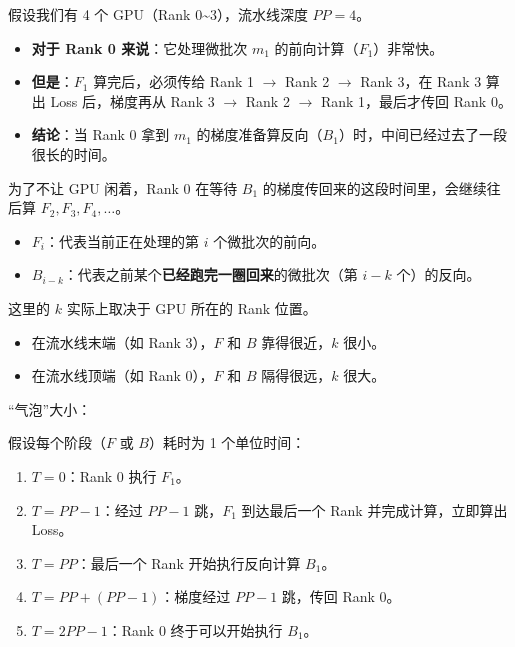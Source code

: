 假设我们有 4 个 GPU（Rank 0\textasciitilde3），流水线深度 \(PP = 4\)。

\begin{itemize}
\tightlist
\item
  \textbf{对于 Rank 0 来说}：它处理微批次 \(m_1\) 的前向计算（\(F_1\)）非常快。
\item
  \textbf{但是}：\(F_1\) 算完后，必须传给 Rank 1 \(\to\) Rank 2 \(\to\) Rank 3，在 Rank 3 算出 Loss 后，梯度再从 Rank 3 \(\to\) Rank 2 \(\to\) Rank 1，最后才传回 Rank 0。
\item
  \textbf{结论}：当 Rank 0 拿到 \(m_1\) 的梯度准备算反向（\(B_1\)）时，中间已经过去了一段很长的时间。
\end{itemize}

为了不让 GPU 闲着，Rank 0 在等待 \(B_1\) 的梯度传回来的这段时间里，会继续往后算 \(F_2, F_3, F_4, \dots\)。

\begin{itemize}
\tightlist
\item
  \(F_i\)：代表当前正在处理的第 \(i\) 个微批次的前向。
\item
  \(B_{i-k}\)：代表之前某个\textbf{已经跑完一圈回来}的微批次（第 \(i-k\) 个）的反向。
\end{itemize}

这里的 \(k\) 实际上取决于 GPU 所在的 Rank 位置。

\begin{itemize}
\tightlist
\item
  在流水线末端（如 Rank 3），\(F\) 和 \(B\) 靠得很近，\(k\) 很小。
\item
  在流水线顶端（如 Rank 0），\(F\) 和 \(B\) 隔得很远，\(k\) 很大。
\end{itemize}

``气泡''大小：

假设每个阶段（\(F\) 或 \(B\)）耗时为 1 个单位时间：

\begin{enumerate}
\def\labelenumi{\arabic{enumi}.}
\tightlist
\item
  \(T = 0\)：Rank 0 执行 \(F_1\)。
\item
  \(T = PP - 1\)：经过 \(PP - 1\) 跳，\(F_1\) 到达最后一个 Rank 并完成计算，立即算出 Loss。
\item
  \(T = PP\)：最后一个 Rank 开始执行反向计算 \(B_1\)。
\item
  \(T = PP + (PP - 1)\)：梯度经过 \(PP - 1\) 跳，传回 Rank 0。
\item
  \(T = 2PP - 1\)：Rank 0 终于可以开始执行 \(B_1\)。
\end{enumerate}

